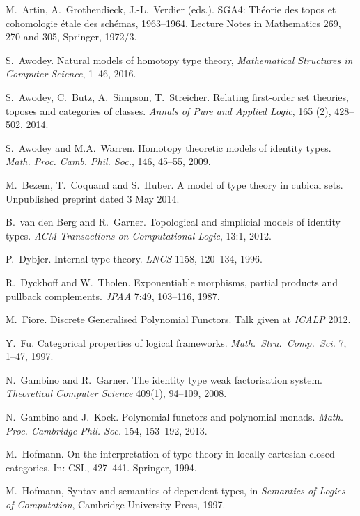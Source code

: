 \documentclass[12pt]{article}
\theoremstyle{definition}
\begin{document}
\begin{thebibliography}{300}


 M.~Artin, A.~Grothendieck,  J.-L.~Verdier (eds.). SGA4: Th\'eorie des topos et cohomologie \'etale des sch\'emas, 1963--1964, Lecture Notes in Mathematics 269, 270 and 305, Springer, 1972/3.

 S.~Awodey. Natural models of homotopy type theory, \emph{Mathematical Structures in Computer Science}, 1--46, 2016.

 S.~Awodey, C.~Butz, A.~Simpson, T.~Streicher. Relating first-order set theories, toposes and categories of classes. \emph{Annals of Pure and Applied Logic}, 165 (2), 428--502, 2014.

 S.~Awodey and M.A.~Warren. Homotopy theoretic models of identity types. \emph{Math. Proc. Camb. Phil. Soc.}, 146, 45--55, 2009.

 M.~Bezem, T.~Coquand and S.~Huber. A model of type theory in cubical sets.  Unpublished preprint dated 3 May 2014.

B.~van den Berg and R.~Garner. Topological and simplicial models of identity types. \emph{ACM Transactions on Computational Logic}, 13:1, 2012.

P.~Dybjer. Internal type theory. \emph{LNCS} 1158, 120--134, 1996.

R.~Dyckhoff and W.~Tholen. Exponentiable morphisms, partial products and pullback complements.  \emph{JPAA} 7:49, 103--116, 1987.

M.~Fiore. Discrete Generalised Polynomial Functors. Talk given at \emph{ICALP} 2012.

 Y.~Fu. Categorical properties of logical frameworks. \emph{Math.\ Stru.\ Comp.\ Sci.} 7, 1--47, 1997.

 N.~Gambino and R.~Garner. The identity type weak factorisation system. \emph{Theoretical Computer Science} 409(1), 94--109, 2008.

N.~Gambino and J.~Kock. Polynomial functors and polynomial monads.
\emph{Math. Proc. Cambridge Phil. Soc.} 154, 153--192, 2013.

 M.~Hofmann.  On the interpretation of type theory in locally cartesian closed categories. In: CSL, 427--441. Springer, 1994. 

 M.~Hofmann, Syntax and semantics of dependent types, in \emph{Semantics of
Logics of Computation}, Cambridge University Press, 1997.


\end{thebibliography}
\end{document}
